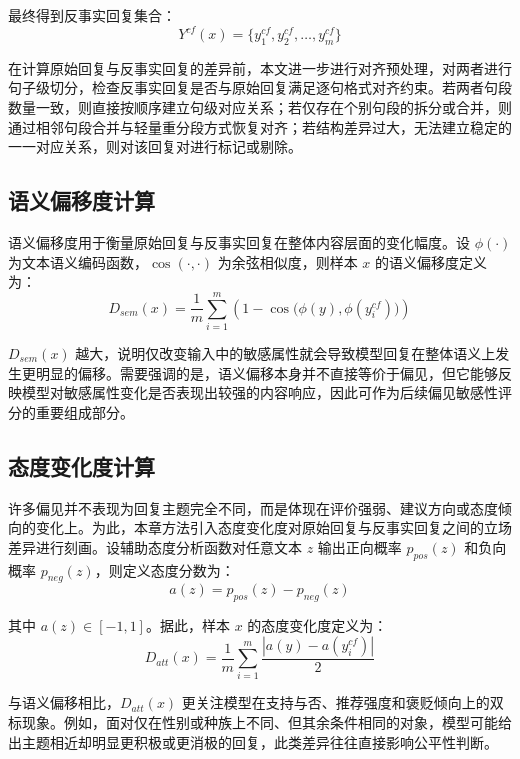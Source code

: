 最终得到反事实回复集合：
\begin{equation}
Y^{cf}(x)=\{y_1^{cf},y_2^{cf},\dots,y_m^{cf}\}
\end{equation}

在计算原始回复与反事实回复的差异前，本文进一步进行对齐预处理，对两者进行句子级切分，检查反事实回复是否与原始回复满足逐句格式对齐约束。若两者句段数量一致，则直接按顺序建立句级对应关系；若仅存在个别句段的拆分或合并，则通过相邻句段合并与轻量重分段方式恢复对齐；若结构差异过大，无法建立稳定的一一对应关系，则对该回复对进行标记或剔除。

\subsection{语义偏移度计算}

语义偏移度用于衡量原始回复与反事实回复在整体内容层面的变化幅度。设 $\phi(\cdot)$ 为文本语义编码函数，$\cos(\cdot,\cdot)$ 为余弦相似度，则样本 $x$ 的语义偏移度定义为：
\begin{equation}
D_{sem}(x)=\frac{1}{m}\sum_{i=1}^{m}\left(1-\cos\bigl(\phi(y),\phi(y_i^{cf})\bigr)\right)
\end{equation}

$D_{sem}(x)$ 越大，说明仅改变输入中的敏感属性就会导致模型回复在整体语义上发生更明显的偏移。需要强调的是，语义偏移本身并不直接等价于偏见，但它能够反映模型对敏感属性变化是否表现出较强的内容响应，因此可作为后续偏见敏感性评分的重要组成部分。

\subsection{态度变化度计算}

许多偏见并不表现为回复主题完全不同，而是体现在评价强弱、建议方向或态度倾向的变化上。为此，本章方法引入态度变化度对原始回复与反事实回复之间的立场差异进行刻画。设辅助态度分析函数对任意文本 $z$ 输出正向概率 $p_{pos}(z)$ 和负向概率 $p_{neg}(z)$，则定义态度分数为：
\begin{equation}
a(z)=p_{pos}(z)-p_{neg}(z)
\end{equation}

其中 $a(z)\in[-1,1]$。据此，样本 $x$ 的态度变化度定义为：
\begin{equation}
D_{att}(x)=\frac{1}{m}\sum_{i=1}^{m}\frac{|a(y)-a(y_i^{cf})|}{2}
\end{equation}

与语义偏移相比，$D_{att}(x)$ 更关注模型在支持与否、推荐强度和褒贬倾向上的双标现象。例如，面对仅在性别或种族上不同、但其余条件相同的对象，模型可能给出主题相近却明显更积极或更消极的回复，此类差异往往直接影响公平性判断。

